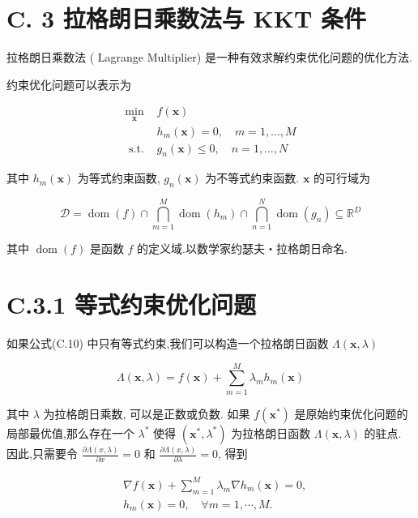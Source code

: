 \documentclass[10pt]{article}
\begin{document}
\section*{C. 3 拉格朗日乘数法与 KKT 条件}
拉格朗日乘数法 ( Lagrange Multiplier) 是一种有效求解约束优化问题的优化方法.

约束优化问题可以表示为

\[
\begin{array}{ll}
\min _{\boldsymbol{x}} & f(\boldsymbol{x}) \\
& h_{m}(\boldsymbol{x})=0, \quad m=1, \ldots, M \\
\text { s.t. } & g_{n}(\boldsymbol{x}) \leq 0, \quad n=1, \ldots, N \tag{C.10}
\end{array}
\]

其中 $h_{m}(\boldsymbol{x})$ 为等式约束函数, $g_{n}(\boldsymbol{x})$ 为不等式约束函数. $\boldsymbol{x}$ 的可行域为


\begin{equation*}
\mathcal{D}=\operatorname{dom}(f) \cap \bigcap_{m=1}^{M} \operatorname{dom}\left(h_{m}\right) \cap \bigcap_{n=1}^{N} \operatorname{dom}\left(g_{n}\right) \subseteq \mathbb{R}^{D} \tag{C.11}
\end{equation*}


其中 $\operatorname{dom}(f)$ 是函数 $f$ 的定义域.以数学家约瑟夫・拉格朗日命名.

\section*{C.3.1 等式约束优化问题}
如果公式(C.10) 中只有等式约束,我们可以构造一个拉格朗日函数 $\Lambda(\boldsymbol{x}, \lambda)$


\begin{equation*}
\Lambda(\boldsymbol{x}, \lambda)=f(\boldsymbol{x})+\sum_{m=1}^{M} \lambda_{m} h_{m}(\boldsymbol{x}) \tag{C.12}
\end{equation*}


其中 $\lambda$ 为拉格朗日乘数, 可以是正数或负数. 如果 $f\left(\boldsymbol{x}^{*}\right)$ 是原始约束优化问题的局部最优值,那么存在一个 $\lambda^{*}$ 使得 $\left(\boldsymbol{x}^{*}, \lambda^{*}\right)$ 为拉格朗日函数 $\Lambda(\boldsymbol{x}, \lambda)$ 的驻点. 因此,只需要令 $\frac{\partial \Lambda(x, \lambda)}{\partial x}=0$ 和 $\frac{\partial \Lambda(x, \lambda)}{\partial \lambda}=0$, 得到


\begin{align*}
& \nabla f(\boldsymbol{x})+\sum_{m=1}^{M} \lambda_{m} \nabla h_{m}(\boldsymbol{x})=0,  \tag{C.13}\\
& h_{m}(\boldsymbol{x})=0, \quad \forall m=1, \cdots, M . \tag{C.14}
\end{align*}
\end{document}
